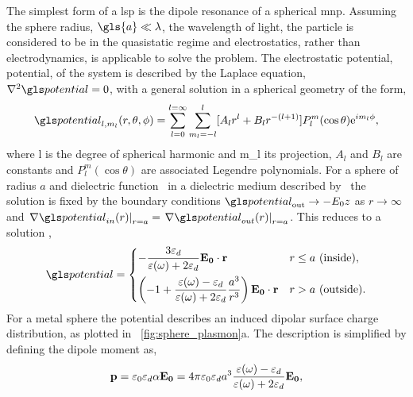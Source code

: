 \documentclass{article}
\begin{document}
The simplest form of a \gls{lsp} is the dipole resonance of a spherical \gls{mnp}. Assuming the sphere radius, $\gls{a}\ll\lambda$, the wavelength of light, the particle is considered to be in the quasistatic regime and electrostatics, rather than electrodynamics, is applicable to solve the problem. The electrostatic potential, \gls{potential}, of the system is described by the Laplace equation, $\nabla^2\pot=0$, with a general solution in a spherical geometry of the form,
\begin{equation}
	\pot_{l,m_l}(r,\theta,\phi) = \sum_{l=0}^{l=\infty} \sum_{m_l=-l}^l [ A_lr^l + B_lr^{-(l+1)} ] P_l^m (\cos\theta) \e^{i m_l\phi},
\end{equation}
where \gls{l} is the degree of spherical harmonic and \gls{m_l} its projection, $A_l$ and $B_l$ are constants and $P_l^m(\cos\theta)$ are associated Legendre polynomials. For a sphere of radius $a$ and dielectric function \dielectric\ in a dielectric medium described by \epsdi\ the solution is fixed by the boundary conditions $\pot_{\mathrm{out}}\rightarrow-E_0z$ as $r\rightarrow\infty$ and $\left.\nabla\pot_{in}(r)\right|_{r=a}=\left.\nabla\pot_{out}(r)\right|_{r=a}$. This reduces to a solution \cite{jackson1999classical},
\begin{equation}
	\pot =
	\begin{dcases}
	-\frac{3\epsdi}{\dielectric + 2\epsdi} \vec{E_0}\cdot\vec{r} & r \leq a\text{ (inside)}, \\
	\left(-1 + \frac{\dielectric - \epsdi}{\dielectric + 2\epsdi} \frac{a^3}{r^3}\right) \vec{E_0}\cdot\vec{r} & r > a\text{ (outside)}.
	\end{dcases}
\end{equation}
For a metal sphere the potential describes an induced dipolar surface charge distribution, as plotted in \figurename~\ref{fig:sphere_plasmon}a. The description is simplified by defining the dipole moment as,
\begin{equation}
	\mathbf{p} = \varepsilon_0\varepsilon_d\alpha\mathbf{E_0} = 4\pi\varepsilon_0\varepsilon_d a^3 \frac{\varepsilon(\omega) - \varepsilon_d}{\varepsilon(\omega) + 2\varepsilon_d} \mathbf{E_0},
\end{equation}
\end{document}
